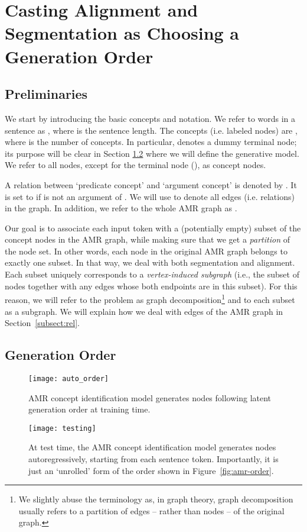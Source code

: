 \documentclass[11pt]{article}
\begin{document}
\section{Casting Alignment and Segmentation as Choosing a Generation Order} 
\subsection{Preliminaries}
\label{sec:seg_notation}


We start by introducing the basic concepts and notation. We refer to words in a sentence as , where  is the sentence length. The concepts (i.e. labeled nodes) are , where  is the number of concepts.
In particular,  denotes a dummy terminal node; its purpose will be clear in Section \ref{sec:generation_order} where we will define the generative model.  We refer to all nodes, except for the terminal node (), as concept nodes. 

A relation between `predicate concept' 
and `argument concept'  is denoted by .  
It is set to  if  is not an argument of .  We will use  to denote all edges (i.e. relations) in the graph. In addition, we refer to the whole AMR graph as . 


Our goal is to associate each input token with a (potentially empty) subset of the concept nodes in the AMR graph, while making sure that we get a {\it partition} of the node set. In other words, each node in the original AMR graph belongs to exactly one subset. In that way, we deal with both segmentation and alignment. 
Each subset uniquely corresponds to a {\it vertex-induced subgraph} (i.e., the subset of nodes together with any edges whose both endpoints are in this subset). For this reason, we will refer to the problem
as graph decomposition\footnote{We slightly abuse the terminology as, in graph theory,  graph decomposition usually refers to a partition of edges -- rather than nodes -- of the original graph.} 
and to each subset as a subgraph. 
We will explain how we deal with edges of the AMR graph in Section~\ref{subsect:rel}.




\subsection{Generation Order}  \label{sec:generation_order}
\begin{figure}[t!]
\centering
\texttt{[image: auto\_order]}
\vspace{-2ex}
\caption{AMR concept identification model generates nodes following latent generation order at training time.} \label{fig:amr-order}
\centering
\texttt{[image: testing]}
\vspace{-2ex}
\caption{At test time, the AMR concept identification model generates nodes autoregressively, starting from each sentence token. Importantly, it is just an `unrolled' form of the order shown in Figure~\ref{fig:amr-order}.} \label{fig:seg_testing}
\end{figure}
\end{document}
